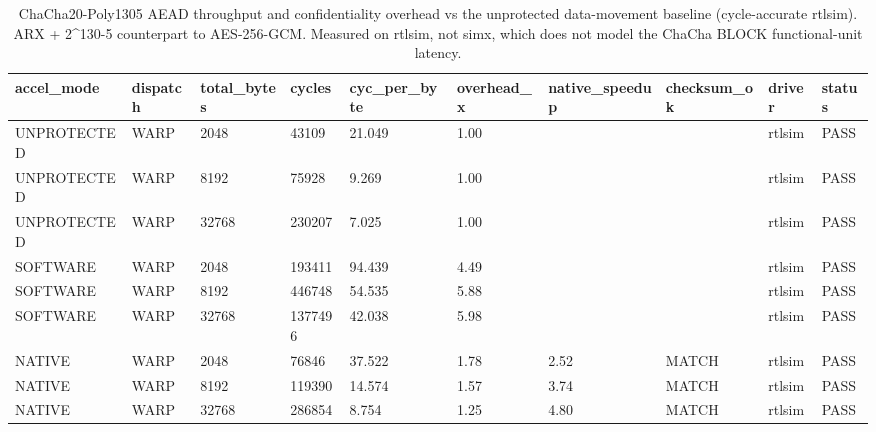 \begin{table}[t]
\centering
\caption{ChaCha20-Poly1305 AEAD throughput and confidentiality overhead vs the unprotected data-movement baseline (cycle-accurate rtlsim). ARX + 2^130-5 counterpart to AES-256-GCM. Measured on rtlsim, not simx, which does not model the ChaCha BLOCK functional-unit latency.}
\label{tab:chacha_aead_overhead}
\begin{tabular}{llllllllll}
\toprule
accel\_mode & dispatch & total\_bytes & cycles & cyc\_per\_byte & overhead\_x & native\_speedup & checksum\_ok & driver & status \\
\midrule
UNPROTECTED & WARP & 2048 & 43109 & 21.049 & 1.00 &  &  & rtlsim & PASS \\
UNPROTECTED & WARP & 8192 & 75928 & 9.269 & 1.00 &  &  & rtlsim & PASS \\
UNPROTECTED & WARP & 32768 & 230207 & 7.025 & 1.00 &  &  & rtlsim & PASS \\
SOFTWARE & WARP & 2048 & 193411 & 94.439 & 4.49 &  &  & rtlsim & PASS \\
SOFTWARE & WARP & 8192 & 446748 & 54.535 & 5.88 &  &  & rtlsim & PASS \\
SOFTWARE & WARP & 32768 & 1377496 & 42.038 & 5.98 &  &  & rtlsim & PASS \\
NATIVE & WARP & 2048 & 76846 & 37.522 & 1.78 & 2.52 & MATCH & rtlsim & PASS \\
NATIVE & WARP & 8192 & 119390 & 14.574 & 1.57 & 3.74 & MATCH & rtlsim & PASS \\
NATIVE & WARP & 32768 & 286854 & 8.754 & 1.25 & 4.80 & MATCH & rtlsim & PASS \\
\bottomrule
\end{tabular}
\end{table}


